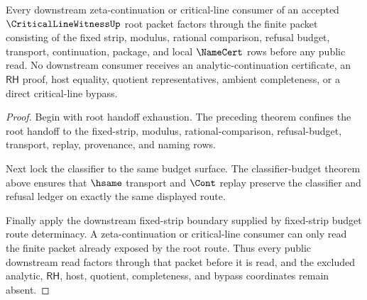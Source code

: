 \begin{theorem}
\label{thm:critical-line-witness-root-downstream-consumer-totality}
Every downstream zeta-continuation or critical-line consumer of an accepted $\CriticalLineWitnessUp$ root packet factors through the finite packet consisting of the fixed strip, modulus, rational comparison, refusal budget, transport, continuation, package, and local $\NameCert$ rows before any public read. No downstream consumer receives an analytic-continuation certificate, an $\mathsf{RH}$ proof, host equality, quotient representatives, ambient completeness, or a direct critical-line bypass.
\end{theorem}
\begin{proof}
Begin with root handoff exhaustion. The preceding theorem confines the root handoff to the fixed-strip, modulus, rational-comparison, refusal-budget, transport, replay, provenance, and naming rows.

Next lock the classifier to the same budget surface. The classifier-budget theorem above ensures that $\hsame$ transport and $\Cont$ replay preserve the classifier and refusal ledger on exactly the same displayed route.

Finally apply the downstream fixed-strip boundary supplied by fixed-strip budget route determinacy. A zeta-continuation or critical-line consumer can only read the finite packet already exposed by the root route. Thus every public downstream read factors through that packet before it is read, and the excluded analytic, $\mathsf{RH}$, host, quotient, completeness, and bypass coordinates remain absent.
\end{proof}
